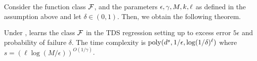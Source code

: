 \documentclass[11pt]{article} %
\numberwithin{equation}{section}
\begin{document}

Consider the function class ${\mathcal{F}}$, and the parameters ${\epsilon},\gamma,M,k,\ell$ as defined in the assumption above and let $\delta\in(0,1)$. Then, we obtain the following theorem.

\begin{theorem}\label{theorem:tds-via-uniform}
    Under ,  learns the class ${\mathcal{F}}$ in the TDS regression setting up to excess error $5\epsilon$ and probability of failure $\delta$. The time complexity is $\mathrm{poly}(d^{s},{1}/{\epsilon},\log(1/\delta)^{\ell})$ where $s=(\ell\log(M/\epsilon))^{O({1}/{\gamma})}$.
\end{theorem}
\end{document}
